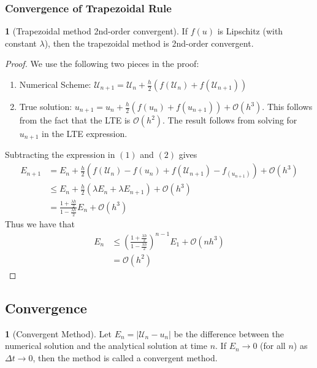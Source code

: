 \documentclass[12pt]{article}
\theoremstyle{definition}
\newtheorem{definition}{\color{NavyBlue}{\textbf{Definition}}}
\newtheorem{theorem}{\color{ForestGreen}{\textbf{Theorem}}}
\newcommand{\U}{\mathcal{U}}
\theoremstyle{definition}
\begin{document}
\subsubsection{Convergence of Trapezoidal Rule}
\begin{theorem}[Trapezoidal method 2nd-order convergent]
	If $f(u)$ is Lipschitz (with constant $\lambda$), then the trapezoidal method is 2nd-order convergent. 
\end{theorem}
\begin{proof}
	We use the following two pieces in the proof:
	\begin{enumerate}
		\item Numerical Scheme: $\U_{n+1} = \U_n + \frac{h}{2}\left(f(\U_n) + f(\U_{n+1})\right)$
		\item True solution: $u_{n+1} = u_n + \frac{h}{2}\left(f(u_n) + f(u_{n+1})\right) + \mathcal{O}(h^3)$. This follows from the fact that the LTE is $\mathcal{O}(h^2)$. The result follows from solving for $u_{n+1}$ in the LTE expression. 
	\end{enumerate}
	Subtracting the expression in $(1)$ and $(2)$ gives
	\begin{align*}
		E_{n+1} &= E_n + \frac{h}{2}\left( f(\U_n) - f(u_n) + f(\U_{n+1}) - f_(u_{n+1})\right) + \mathcal{O}(h^3) \\
		&\leq E_n + \frac{h}{2}(\lambda E_n + \lambda E_{n+1}) + \mathcal{O}(h^3) \tag{$f$ Lipschitz} \\
		&= \frac{1 + \frac{\lambda h}{2}}{1 - \frac{\lambda h}{2}}E_n + \mathcal{O}(h^3)
	\end{align*}
	Thus we have that
	\begin{align*}
		E_n &\leq \left(\frac{1 + \frac{\lambda h}{2}}{1 - \frac{\lambda h}{2}}\right)^{n-1}E_1 + \mathcal{O}(nh^3) \\
		&= \mathcal{O}(h^2)
	\end{align*}
\end{proof}

\subsection{Convergence}
\begin{definition}[Convergent Method]
	Let $E_n = |\U_n - u_n|$ be the difference between the numerical solution and the analytical solution at time $n$. If $E_n \to 0$ (for all $n$) as $\Delta t \to 0$, then the method is called a convergent method. 
\end{definition}
\end{document}
